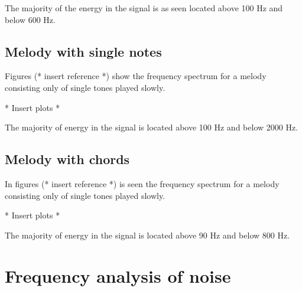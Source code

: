 The majority of the energy in the signal is as seen located above 100 Hz and below 600 Hz.

\subsection{Melody with single notes}
Figures (* insert reference *) show the frequency spectrum for a melody consisting only of single tones played slowly.
\begin{center}
* Insert plots *
\end{center}

The majority of energy in the signal is located above 100 Hz and below 2000 Hz.

\subsection{Melody with chords}
In figures (* insert reference *) is seen the frequency spectrum for a melody consisting only of single tones played slowly.
\begin{center}
* Insert plots *
\end{center}

The majority of energy in the signal is located above 90 Hz and below 800 Hz.

\section{Frequency analysis of noise}